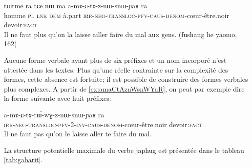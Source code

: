 \documentclass[oldfontcommands,oneside,a4paper,11pt]{article}
\newcommand{\ipa}[1]{{\phon \mbox{#1}}} %
\begin{document}
\begin{exe}
\ex  \label{ex:amaCtAznWsnWYaR}
\gll
\ipa{tɯrme}  	\ipa{ra}  	\ipa{tɕe}  	\ipa{nɯ}  	\ipa{ma}  	\ipa{a-mɤ-ɕ-tɤ-z-nɯ-snɯ-ɲaʁ}  	\ipa{ra}  \\
homme \textsc{pl} \textsc{lnk} \textsc{dem} à.part \textsc{irr-neg-transloc-pfv-caus-denom}-cœur-être.noir devoir:\textsc{fact} \\
\glt Il ne faut plus qu'on la laisse ailler faire du mal aux gens. (fushang he yaomo, 162)
\end{exe}

Aucune forme verbale ayant plus de six préfixes et un nom incorporé n'est attestée dans les textes. Plus qu'une réelle contrainte sur la complexité des formes, cette absence est fortuite; il est possible de construire des formes verbales plus complexes. A partir de \ref{ex:amaCtAznWsnWYaR}, on peut par exemple dire la forme suivante avec huit préfixes:
\begin{exe}
\ex  \label{ex:amaCtAtWwGznWsnWYaR}
\gll
	\ipa{a-mɤ-ɕ-tɤ-tɯ́-wɣ-z-nɯ-snɯ-ɲaʁ}  	\ipa{ra}  \\
  \textsc{irr-neg-transloc-pfv-2-inv-caus-denom}-cœur-être.noir devoir:\textsc{fact} \\
\glt Il ne faut pas qu'on le laisse aller te faire du mal.
\end{exe}
La structure potentielle maximale du verbe japhug est présentée dans le tableau \ref{tab:gabarit}.
\end{document}
